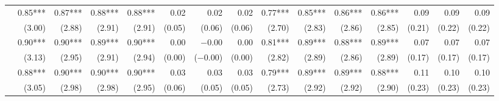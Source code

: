 \begin{tabularx}{1.45\textwidth}{lRRRRRRRRRRRRRR}
		 & \num{0.85}***\phantom{)} & \num{0.87}***\phantom{)} & \num{0.88}***\phantom{)} & \num{0.88}***\phantom{)} & \num{0.02}\phantom{***)} & \num{0.02}\phantom{***)} & \num{0.02}\phantom{***)} & \num{0.77}***\phantom{)} & \num{0.85}***\phantom{)} & \num{0.86}***\phantom{)} & \num{0.86}***\phantom{)} & \num{0.09}\phantom{***)} & \num{0.09}\phantom{***)} & \num{0.09}\phantom{***)} \\
		 & (\num{3.00})\phantom{***} & (\num{2.88})\phantom{***} & (\num{2.91})\phantom{***} & (\num{2.91})\phantom{***} & (\num{0.05})\phantom{***} & (\num{0.06})\phantom{***} & (\num{0.06})\phantom{***} & (\num{2.70})\phantom{***} & (\num{2.83})\phantom{***} & (\num{2.86})\phantom{***} & (\num{2.85})\phantom{***} & (\num{0.21})\phantom{***} & (\num{0.22})\phantom{***} & (\num{0.22})\phantom{***} \\ [\dspacing]
		 & \num{0.90}***\phantom{)} & \num{0.90}***\phantom{)} & \num{0.89}***\phantom{)} & \num{0.90}***\phantom{)} & \num{0.00}\phantom{***)} & \num{-0.00}\phantom{***)} & \num{0.00}\phantom{***)} & \num{0.81}***\phantom{)} & \num{0.89}***\phantom{)} & \num{0.88}***\phantom{)} & \num{0.89}***\phantom{)} & \num{0.07}\phantom{***)} & \num{0.07}\phantom{***)} & \num{0.07}\phantom{***)} \\
		 & (\num{3.13})\phantom{***} & (\num{2.95})\phantom{***} & (\num{2.91})\phantom{***} & (\num{2.94})\phantom{***} & (\num{0.00})\phantom{***} & (\num{-0.00})\phantom{***} & (\num{0.00})\phantom{***} & (\num{2.82})\phantom{***} & (\num{2.89})\phantom{***} & (\num{2.86})\phantom{***} & (\num{2.89})\phantom{***} & (\num{0.17})\phantom{***} & (\num{0.17})\phantom{***} & (\num{0.17})\phantom{***} \\ [\dspacing]
		 & \num{0.88}***\phantom{)} & \num{0.90}***\phantom{)} & \num{0.90}***\phantom{)} & \num{0.90}***\phantom{)} & \num{0.03}\phantom{***)} & \num{0.03}\phantom{***)} & \num{0.03}\phantom{***)} & \num{0.79}***\phantom{)} & \num{0.89}***\phantom{)} & \num{0.89}***\phantom{)} & \num{0.88}***\phantom{)} & \num{0.11}\phantom{***)} & \num{0.10}\phantom{***)} & \num{0.10}\phantom{***)} \\
		 & (\num{3.05})\phantom{***} & (\num{2.98})\phantom{***} & (\num{2.98})\phantom{***} & (\num{2.95})\phantom{***} & (\num{0.06})\phantom{***} & (\num{0.05})\phantom{***} & (\num{0.05})\phantom{***} & (\num{2.73})\phantom{***} & (\num{2.92})\phantom{***} & (\num{2.92})\phantom{***} & (\num{2.90})\phantom{***} & (\num{0.23})\phantom{***} & (\num{0.23})\phantom{***} & (\num{0.23})\phantom{***} \\ [\dspacing]

\end{tabularx}
